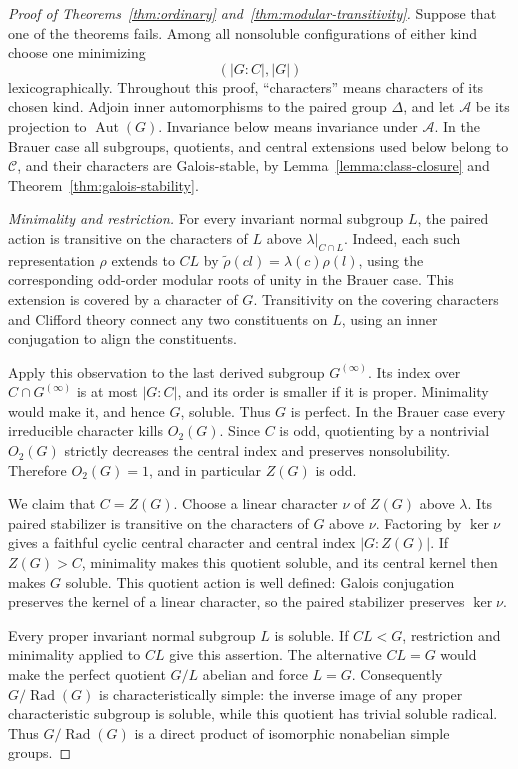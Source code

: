\documentclass[11pt,a4paper]{amsart}
\DeclareMathOperator{\Aut}{Aut}
\DeclareMathOperator{\Rad}{Rad}
\theoremstyle{remark}
\numberwithin{equation}{section}
\begin{document}
\begin{proof}[Proof of Theorems~\ref{thm:ordinary}
and~\ref{thm:modular-transitivity}]
Suppose that one of the theorems fails. Among all nonsoluble configurations
of either kind choose one minimizing
\[
 (|G:C|,|G|)
\]
lexicographically. Throughout this proof, ``characters'' means characters
of its chosen kind. Adjoin inner automorphisms to the paired group
$\Delta$, and let $\mathcal A$ be its projection to $\Aut(G)$.
Invariance below means invariance under $\mathcal A$.
In the Brauer case all subgroups, quotients, and central extensions used
below belong to $\mathcal C$, and their characters are Galois-stable, by
Lemma~\ref{lemma:class-closure} and Theorem~\ref{thm:galois-stability}.

\smallskip\noindent\emph{Minimality and restriction.}
For every invariant normal subgroup $L$, the paired action is transitive
on the characters of $L$ above $\lambda|_{C\cap L}$. Indeed, each such
representation $\rho$ extends to $CL$ by
$\widetilde\rho(cl)=\lambda(c)\rho(l)$, using the corresponding
odd-order modular roots of unity in the Brauer case. This extension
is covered by a character of $G$. Transitivity on the covering characters and Clifford theory
connect any two constituents on $L$, using an inner conjugation to align
the constituents.

Apply this observation to the last derived subgroup $G^{(\infty)}$.
Its index over $C\cap G^{(\infty)}$ is at most $|G:C|$, and its order
is smaller if it is proper. Minimality would make it, and hence $G$,
soluble. Thus $G$ is perfect.
In the Brauer case every irreducible character kills $O_2(G)$.
Since $C$ is odd, quotienting by a nontrivial $O_2(G)$ strictly decreases
the central index and preserves nonsolubility. Therefore $O_2(G)=1$,
and in particular $Z(G)$ is odd.

We claim that $C=Z(G)$. Choose a linear character $\nu$ of $Z(G)$ above
$\lambda$. Its paired stabilizer is transitive on the characters of
$G$ above $\nu$. Factoring by $\ker\nu$ gives a faithful cyclic central
character and central index $|G:Z(G)|$. If $Z(G)>C$, minimality makes
this quotient soluble, and its central kernel then makes $G$ soluble.
This quotient action is well defined: Galois conjugation preserves the
kernel of a linear character, so the paired stabilizer preserves
$\ker\nu$.

Every proper invariant normal subgroup $L$ is soluble. If $CL<G$,
restriction and minimality applied to $CL$ give this assertion. The
alternative $CL=G$ would make the perfect quotient $G/L$ abelian and
force $L=G$. Consequently $G/\Rad(G)$ is characteristically simple:
the inverse image of any proper characteristic subgroup is soluble,
while this quotient has trivial soluble radical. Thus
$G/\Rad(G)$ is a direct product of isomorphic nonabelian simple groups.


\end{proof}
\end{document}
